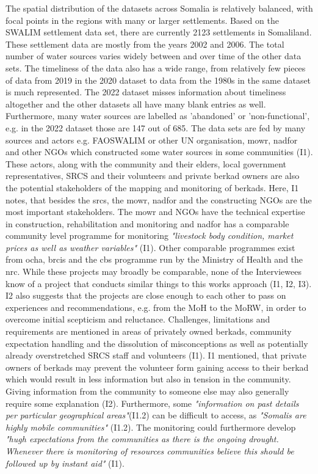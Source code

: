 The spatial distribution of the datasets across Somalia is relatively balanced, with focal points in the regions with many or larger settlements. Based on the SWALIM settlement data set, there are currently 2123 settlements in Somaliland. These settlement data are mostly from the years 2002 and 2006. The total number of water sources varies widely between and over time of the other data sets. The timeliness of the data also has a wide range, from relatively few pieces of data from 2019 in the 2020 dataset to data from the 1980s in the same dataset is much represented. The 2022 dataset misses information about timeliness altogether and the other datasets all have many blank entries as well. Furthermore, many water sources are labelled as 'abandoned' or 'non-functional', e.g. in the 2022 dataset those are 147 out of 685.\newline
The data sets are fed by many sources and actors e.g. FAOSWALIM or other UN organisation, \acrshort*{mowr}, \acrshort*{nadfor} and other NGOs which constructed some water sources in some communities (I1). These actors, along with the community and their elders, local government representatives, SRCS and their volunteers and private berkad owners are also the potential stakeholders of the mapping and monitoring of berkads. Here, I1 notes, that besides the \acrshort*{srcs}, the \acrshort*{mowr}, \acrshort*{nadfor} and the constructing NGOs are the most important stakeholders. The \acrshort*{mowr} and NGOs have the technical expertise in construction, rehabilitation and monitoring and \acrshort*{nadfor} has a comparable community level programme for monitoring \textit{"livestock body condition, market prices as well as weather variables"} (I1). 
Other comparable programmes exist from \acrshort*{ocha}, \acrshort*{brcis} and the \acrshort*{cbs} programme run by the Ministry of Health and the \acrshort*{nrc}. While these projects may broadly be comparable, none of the Interviewees know of a project that conducts similar things to this works approach (I1, I2, I3). I2 also suggests that the projects are close enough to each other to pass on experiences and recommendations, e.g. from the MoH to the MoRW, in order to overcome initial scepticism and reluctance.\newline
Challenges, limitations and requirements are mentioned in areas of privately owned berkads, community expectation handling and the dissolution of misconceptions as well as potentially already overstretched SRCS staff and volunteers (I1). I1 mentioned, that private owners of berkads may prevent the volunteer form gaining access to their berkad which would result in less information but also in tension in the community. Giving information from the community to someone else may also generally require some explanation (I2). Furthermore, some \textit{"information on past details per particular geographical areas"}(I1.2) can be difficult to access, as \textit{"Somalis are highly mobile communities"} (I1.2). The monitoring could furthermore develop \textit{"hugh expectations from the communities as there is the ongoing drought. Whenever there is monitoring of resources communities believe this should be followed up by instant aid"} (I1). 

